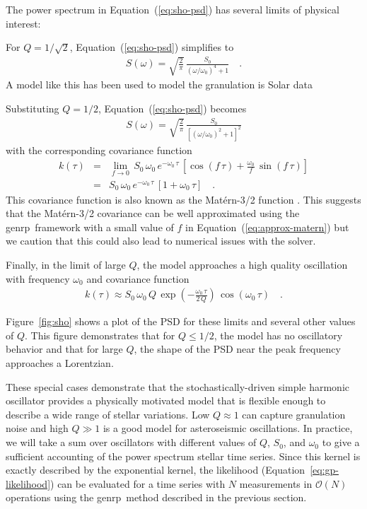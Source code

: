 \documentclass[manuscript, letterpaper]{aastex6}
\newcommand{\project}[1]{\textsf{#1}}
\newcommand{\genrp}{\project{genrp}}
\newcommand{\figureref}[1]{\ref{fig:#1}}
\newcommand{\Figure}[1]{Figure~\figureref{#1}}
\renewcommand{\eqref}[1]{\ref{eq:#1}}
\newcommand{\Eq}[1]{Equation~(\eqref{#1})}
\newcommand{\eq}[1]{\Eq{#1}}
\newcommand{\eqalt}[1]{Equation~\eqref{#1}}
\newcommand{\eqlabel}[1]{\label{eq:#1}}
\begin{document}
The power spectrum in \eq{sho-psd} has several limits of physical interest:
\begin{itemize}

{\item For $Q = 1/\sqrt{2}$, \eq{sho-psd} simplifies to
\begin{eqnarray}
S(\omega) = \sqrt{\frac{2}{\pi}}\,\frac{S_0}{(\omega/\omega_0)^4+1} \quad.
\end{eqnarray}
A model like this has been used to model the granulation is Solar data
\citep{Michel:2009}}

{\item Substituting $Q = 1/2$, \eq{sho-psd} becomes
\begin{eqnarray}
S(\omega) =
\sqrt{\frac{2}{\pi}}\,\frac{S_0}{\left[(\omega/\omega_0)^2+1\right]^2}
\end{eqnarray}
with the corresponding covariance function
\begin{eqnarray}\eqlabel{approx-matern}
k(\tau) &=& \lim_{f \to 0}\,
    S_0\,\omega_0\,e^{-\omega_0\,\tau}\,
    \left[\cos(f\,\tau) + \frac{\omega_0}{f}\,\sin(f\,\tau)\right] \\
&=& S_0\,\omega_0\,e^{-\omega_0\,\tau}\,[1+\omega_0\,\tau] \quad.
\end{eqnarray}
This covariance function is also known as the Mat\'ern-3/2 function
\citep{Rasmussen:2006}.
This suggests that the Mat\'ern-3/2 covariance can be well approximated using
the \genrp\ framework with a small value of $f$ in \eq{approx-matern} but we
caution that this could also lead to numerical issues with the solver.
}

{\item Finally, in the limit of large $Q$, the model approaches a high
    quality oscillation with frequency $\omega_0$ and covariance function
\begin{eqnarray}
k(\tau) \approx
    S_0\,\omega_0\,Q\,
    \exp\left(-\frac{\omega_0\,\tau}{2\,Q}\right)\,
    \cos\left(\omega_0\,\tau\right) \quad.
\end{eqnarray}}

\end{itemize}
\Figure{sho} shows a plot of the PSD for these limits and several other values
of $Q$.
This figure demonstrates that for $Q \le 1/2$, the model has no oscillatory
behavior and that for large $Q$, the shape of the PSD near the peak frequency
approaches a Lorentzian.

These special cases demonstrate that the stochastically-driven simple harmonic
oscillator provides a physically motivated model that is flexible enough to
describe a wide range of stellar variations.
Low $Q \approx 1$ can capture granulation noise and high $Q \gg 1$ is a good
model for asteroseismic oscillations.
In practice, we will take a sum over oscillators with different values of $Q$,
$S_0$, and $\omega_0$ to give a sufficient accounting of the power spectrum
stellar time series.
Since this kernel is exactly described by the exponential kernel, the
likelihood (\eqalt{gp-likelihood}) can be evaluated for a time series with $N$
measurements in $\mathcal{O}(N)$ operations using the \genrp\ method described
in the previous section.
\end{document}
